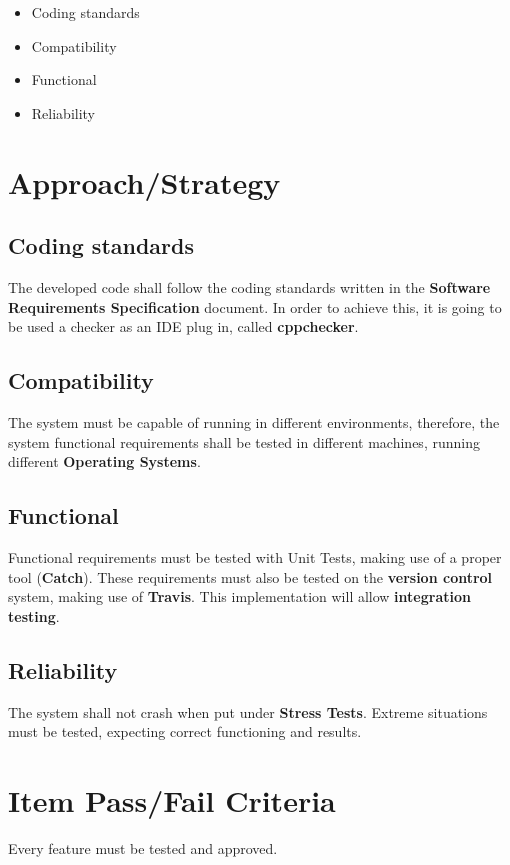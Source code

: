 \documentclass[12pt]{article}
\begin{document}
\begin{itemize}  
\item Coding standards
\item Compatibility 
\item Functional 
\item Reliability
\end{itemize}

\section*{Approach/Strategy}

\subsection*{Coding standards}

\par The developed code shall follow the coding standards written in the \textbf{Software Requirements Specification} document. In order to achieve this, it is going to be used a checker as an IDE plug in, called \textbf{cppchecker}.

\subsection*{Compatibility}

\par The system must be capable of running in different environments, therefore, the system functional requirements shall be tested in different machines, running different \textbf{Operating Systems}.


\subsection*{Functional}

\par Functional requirements must be tested with Unit Tests, making use of a proper tool (\textbf{Catch}). These requirements must also be tested on the \textbf{version control} system, making use of \textbf{Travis}. This implementation will allow \textbf{integration testing}.

\subsection*{Reliability}

\par The system shall not crash when put under \textbf{Stress Tests}. Extreme situations must be tested, expecting correct functioning and results.

\section*{Item Pass/Fail Criteria}

\par Every feature must be tested and approved.
\end{document}
